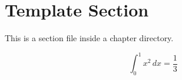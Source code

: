 \section{Template Section}

This is a section file inside a chapter directory.

\begin{equation}
\int_0^1 x^2 \, dx = \frac{1}{3}
\end{equation}
